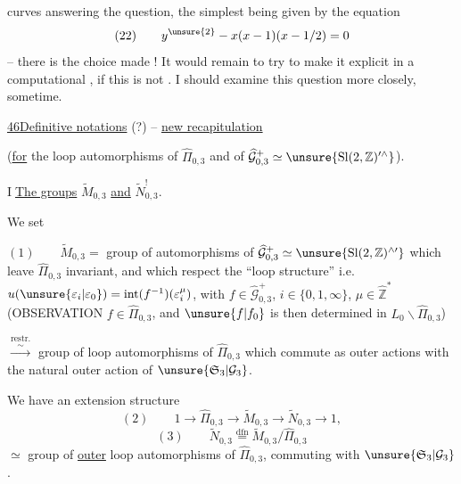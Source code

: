 
curves answering the question, the simplest being given by the equation
\[
(22)\qquad y^{\unsure{2}}-x(x-1)(x-1/2)=0
\]
--  there is the choice made ! It would remain to try to make it explicit  in a computational , if this is not . I should examine this  question more closely, sometime.


\uline{46}\quad \uline{Definitive notations} (?) -- \uline{new recapitulation}

(\uline{for} the loop automorphisms of $\widehat{\Pi}_{0,3}$ and of $\widehat{\mathcal G}_{0,3}^{+}\simeq\unsure{\mathrm{Sl}(2,\mathbb Z)^{\prime\wedge}}$).

\textcircled{I}\quad \uline{The groups} $\widetilde M_{0,3}$ \uline{and} $\widetilde N_{0,3}^{!}$.

We set

$(1)\qquad\widetilde M_{0,3}=$ group of automorphisms of $\widehat{\mathcal G}_{0,3}^{+}\simeq\unsure{\mathrm{Sl}(2,\mathbb Z)^{\wedge\prime}}$ which leave $\widehat{\Pi}_{0,3}$ invariant, and which respect the ``loop structure'' i.e.  $u(\unsure{\varepsilon_i|\varepsilon_0})=\operatorname{int}(f^{-1})(\varepsilon_i^\mu)$, with $f\in\widehat{\mathcal G}_{0,3}^{+}$, $i\in\{0,1,\infty\}$, $\mu\in\widehat{\mathbb Z}^{*}$ (OBSERVATION $f\in\widehat{\Pi}_{0,3}$, and $\unsure{f|f_0}$ is then determined in $L_0\backslash\widehat{\Pi}_{0,3}$)

$\overset{\mathrm{restr.}}{\overset{\sim}{\longrightarrow}}$ group of  loop automorphisms of $\widehat{\Pi}_{0,3}$ which commute as outer actions with the natural outer action of $\unsure{\mathfrak S_3|\mathcal G_3}$.


We have an extension structure
\[
(2)\qquad 1\longrightarrow\widehat{\Pi}_{0,3}\longrightarrow\widetilde M_{0,3}\longrightarrow\widetilde N_{0,3}\longrightarrow1,
\]
 
\[
(3)\qquad\widetilde N_{0,3}\overset{\mathrm{dfn}}{=}\widetilde M_{0,3}/\widehat{\Pi}_{0,3}
\]
$\simeq$ group of \uline{outer} loop automorphisms of $\widehat{\Pi}_{0,3}$, commuting with $\unsure{\mathfrak S_3|\mathcal G_3}$.

